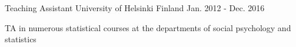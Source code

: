 \begin{cventries}
  \cventry
    {Teaching Assistant} %
    {University of Helsinki} %
    {Finland} %
    {Jan. 2012 - Dec. 2016} %
    {
      \begin{cvitems} %
        \item {TA in numerous statistical courses at the departments of social psychology and statistics}
      \end{cvitems}
    }

\end{cventries}
